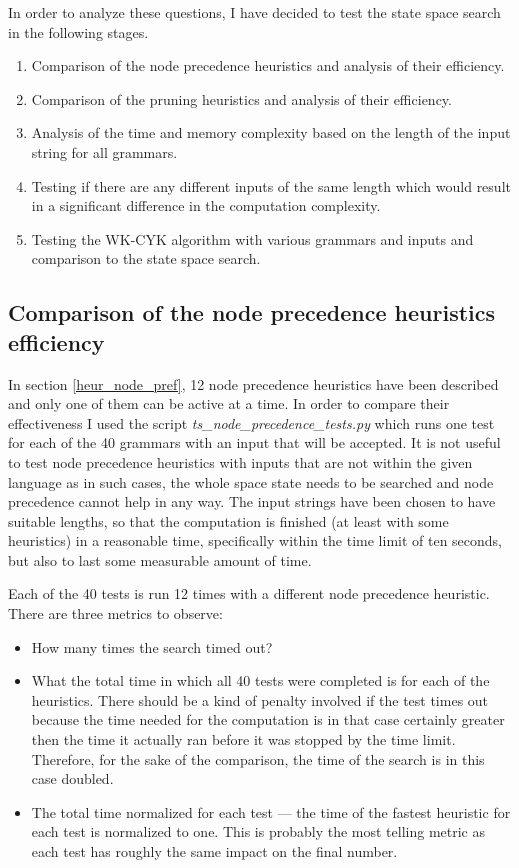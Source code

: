 In order to analyze these questions, I have decided to test the state space search in the following stages.
\begin{enumerate}
  \item{Comparison of the node precedence heuristics and analysis of their efficiency.}
  \item{Comparison of the pruning heuristics and analysis of their efficiency.}
  \item{Analysis of the time and memory complexity based on the length of the input string for all grammars.}
  \item{Testing if there are any different inputs of the same length which would result in a significant difference in the computation complexity.}
  \item{Testing the WK-CYK algorithm with various grammars and inputs and comparison to the state space search.}
\end{enumerate}

\subsection{Comparison of the node precedence heuristics efficiency}
In section \ref{heur_node_pref}, 12 node precedence heuristics have been described and only one of them can be active at a time.
In order to compare their effectiveness I used the script \textit{ts\_node\_precedence\_tests.py} which runs one test for each of the 40 grammars with an input that will be accepted. It is not useful to test node precedence heuristics with inputs that are not within the given language as in such cases, the whole space state needs to be searched and node precedence cannot help in any way. The input strings have been chosen to have suitable lengths, so that the computation is finished (at least with some heuristics) in a reasonable time, specifically within the time limit of ten seconds, but also to last some measurable amount of time.

Each of the 40 tests is run 12 times with a different node precedence heuristic. There are three metrics to observe:
\begin{itemize}
  \item{How many times the search timed out?}
  \item{What the total time in which all 40 tests were completed is for each of the heuristics. There should be a kind of penalty involved if the test times out because the time needed for the computation is in that case certainly greater then the time it actually ran before it was stopped by the time limit. Therefore, for the sake of the comparison, the time of the search is in this case doubled.}
  \item{The total time normalized for each test --- the time of the fastest heuristic for each test is normalized to one. This is probably the most telling metric as each test has roughly the same impact on the final number.}
\end{itemize}

